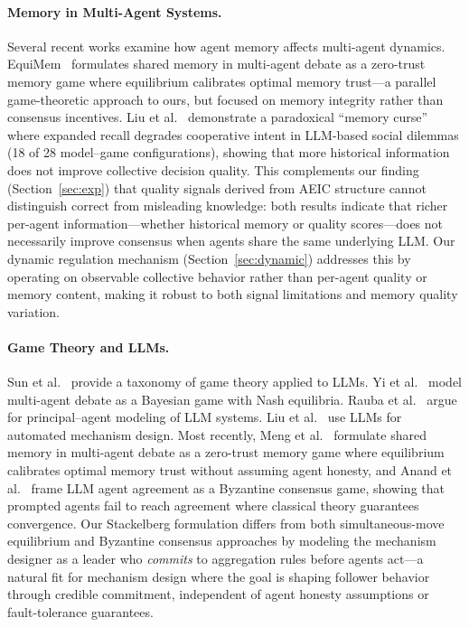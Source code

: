 \paragraph{Memory in Multi-Agent Systems.}
Several recent works examine how agent memory affects multi-agent dynamics. EquiMem~\cite{meng2026equimem} formulates shared memory in multi-agent debate as a zero-trust memory game where equilibrium calibrates optimal memory trust---a parallel game-theoretic approach to ours, but focused on memory integrity rather than consensus incentives. Liu et al.~\cite{liu2025memorycurse} demonstrate a paradoxical ``memory curse'' where expanded recall degrades cooperative intent in LLM-based social dilemmas (18 of 28 model--game configurations), showing that more historical information does not improve collective decision quality. This complements our finding (Section~\ref{sec:exp}) that quality signals derived from AEIC structure cannot distinguish correct from misleading knowledge: both results indicate that richer per-agent information---whether historical memory or quality scores---does not necessarily improve consensus when agents share the same underlying LLM. Our dynamic regulation mechanism (Section~\ref{sec:dynamic}) addresses this by operating on observable collective behavior rather than per-agent quality or memory content, making it robust to both signal limitations and memory quality variation.

\paragraph{Game Theory and LLMs.}
Sun et al.~\cite{sun2025gametheory} provide a taxonomy of game theory applied to LLMs. Yi et al.~\cite{yi2025debate} model multi-agent debate as a Bayesian game with Nash equilibria. Rauba et al.~\cite{rauba2025principal} argue for principal--agent modeling of LLM systems. Liu et al.~\cite{liu2025interpretable} use LLMs for automated mechanism design. Most recently, Meng et al.~\cite{meng2026equimem} formulate shared memory in multi-agent debate as a zero-trust memory game where equilibrium calibrates optimal memory trust without assuming agent honesty, and Anand et al.~\cite{anand2026resilient} frame LLM agent agreement as a Byzantine consensus game, showing that prompted agents fail to reach agreement where classical theory guarantees convergence. Our Stackelberg formulation differs from both simultaneous-move equilibrium and Byzantine consensus approaches by modeling the mechanism designer as a leader who \emph{commits} to aggregation rules before agents act---a natural fit for mechanism design where the goal is shaping follower behavior through credible commitment, independent of agent honesty assumptions or fault-tolerance guarantees.

